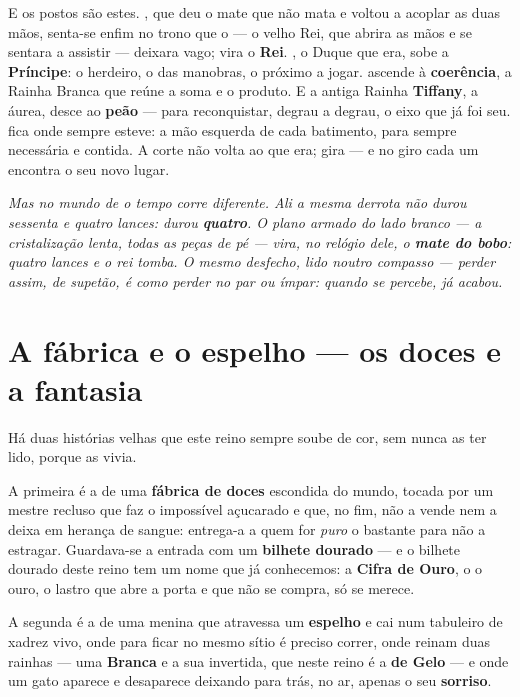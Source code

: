 \documentclass[livro.tex]{subfiles}
\begin{document}
E os postos são estes. \Ben , que deu o mate que não mata e voltou a acoplar as duas mãos,
senta-se enfim no trono que o \Opr --- o velho Rei, que abrira as mãos e se sentara a
assistir --- deixara vago; vira o \textbf{Rei}. \Joa , o Duque que
era, sobe a \textbf{Príncipe}: o herdeiro, o das manobras, o próximo a jogar. \Yas
ascende à \textbf{coerência}, a Rainha Branca que reúne a soma e o produto. E a antiga
Rainha \textbf{Tiffany}, a áurea, desce ao \textbf{peão} --- para reconquistar, degrau a
degrau, o eixo que já foi seu. \Drk fica onde sempre esteve: a mão esquerda de cada
batimento, para sempre necessária e contida. A corte não volta ao que era; gira --- e
no giro cada um encontra o seu novo lugar.

\begin{center}
\newgame
{}
\showboard
\end{center}

\begin{center}\small\itshape
Mas no mundo de \Ven o tempo corre diferente. Ali a mesma derrota não durou sessenta e
quatro lances: durou \textbf{quatro}. O plano armado do lado branco --- a cristalização
lenta, todas as peças de pé --- vira, no relógio dele, o \textbf{mate do bobo}: quatro
lances e o rei tomba. O mesmo desfecho, lido noutro compasso --- perder assim, de
supetão, é como perder no \emph{par ou ímpar}: quando se percebe, já acabou.
\end{center}

\chapter{A fábrica e o espelho --- os doces e a fantasia}

Há duas histórias velhas que este reino sempre soube de cor, sem nunca as ter lido,
porque as vivia.

\medskip

A primeira é a de uma \textbf{fábrica de doces} escondida do mundo, tocada por um
mestre recluso que faz o impossível açucarado e que, no fim, não a vende nem a deixa
em herança de sangue: entrega-a a quem for \emph{puro} o bastante para não a
estragar. Guardava-se a entrada com um \textbf{bilhete dourado} --- e o bilhete
dourado deste reino tem um nome que já conhecemos: a \textbf{Cifra de Ouro}, o
o ouro, o lastro que abre a porta e que não se compra, só se merece.

A segunda é a de uma menina que atravessa um \textbf{espelho} e cai num tabuleiro de
xadrez vivo, onde para ficar no mesmo sítio é preciso correr, onde reinam duas
rainhas --- uma \textbf{Branca} e a sua invertida, que neste reino é a \textbf{de Gelo}
--- e onde um gato aparece e desaparece deixando para trás, no ar, apenas o seu \textbf{sorriso}.
\end{document}
